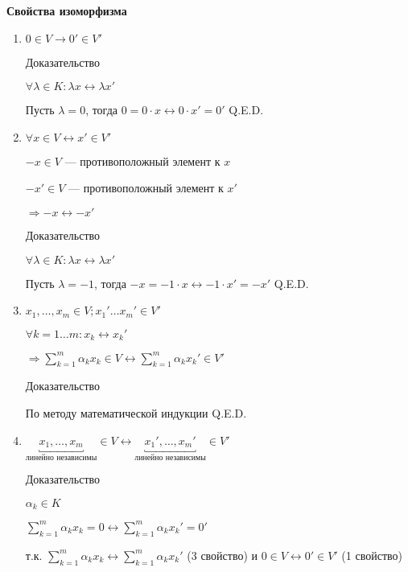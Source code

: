 \textbf{Свойства изоморфизма}

\begin{enumerate}
    \item \(0 \in V \longrightarrow 0' \in V'\)

          Доказательство

          \(\forall \lambda \in K: \lambda x \longleftrightarrow \lambda x'\)

          Пусть \(\lambda = 0\), тогда \(0 = 0 \cdot x \longleftrightarrow 0 \cdot x' = 0'\)
          \hfill Q.E.D.

    \item \(\forall x \in V \longleftrightarrow x' \in V'\)

          \(-x \in V\) --- противоположный элемент к \(x\)

          \(-x' \in V\) --- противоположный элемент к \(x'\)

          \(\Rightarrow -x \longleftrightarrow -x'\)

          Доказательство

          \(\forall \lambda \in K: \lambda x \longleftrightarrow \lambda x'\)

          Пусть \(\lambda = -1\), тогда \(-x = -1 \cdot x \longleftrightarrow -1 \cdot x' = -x'\)
          \hfill Q.E.D.

    \item
          \(x_1, \ldots, x_m \in V; x_1' \ldots x_m' \in V'\)

          \(\forall k = 1 \ldots m: x_k \longleftrightarrow x_k'\)

          \(\Rightarrow \sum\limits_{k = 1}^{m} \alpha_k x_k \in V \longleftrightarrow \sum\limits_{k = 1}^{m} \alpha_k x_k' \in V'\)

          Доказательство

          По методу математической индукции
          \hfill Q.E.D.

    \item \(\underbracket{x_1, \ldots
              , x_m}_{\text{линейно независимы}} \in V \longleftrightarrow \underbracket{x_1', \ldots, x_m'}_{\text{линейно независимы}} \in V'\)

          Доказательство

          \(\alpha_k \in K\)

          \(\sum\limits_{k = 1}^{m} \alpha_k x_k = 0 \longleftrightarrow \sum\limits_{k = 1}^{m} \alpha_k x_k' = 0'\)

          т.к. \(\sum\limits_{k = 1}^{m} \alpha_k x_k \longleftrightarrow \sum\limits_{k = 1}^{m} \alpha_k x_k'\) (3 свойство) и \(0 \in V \longleftrightarrow 0' \in V'\) (1 свойство)


\end{enumerate}
